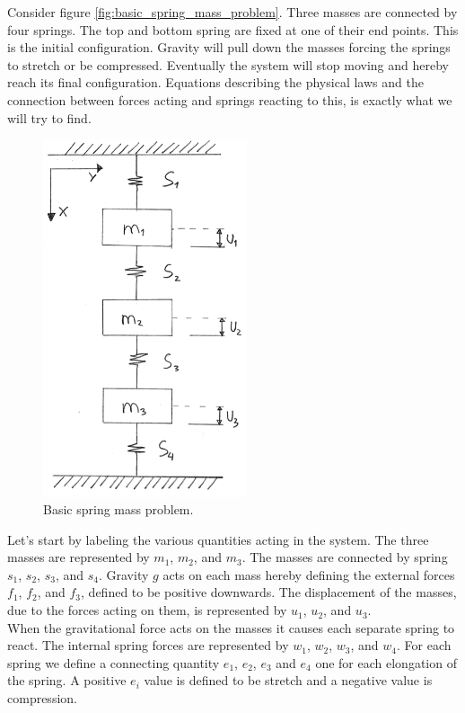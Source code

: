 Consider figure \vref{fig:basic_spring_mass_problem}.
Three masses are connected by four
springs. The top and bottom spring are fixed at one of their end
points. This is the
initial configuration. Gravity will pull down the masses forcing the
springs to stretch or be compressed. Eventually the system will stop
moving and hereby reach its final configuration. Equations
describing the physical laws and the connection between forces acting
and springs reacting to this, is exactly what we will try to find. \\

\layoutnewpage

\begin{figure}
  \centering
  \includegraphics[width=6cm]{./images/equilibrium_framework_basic_spring_mass_problem.png}
\caption{Basic spring mass problem.}
\label{fig:basic_spring_mass_problem}
\end{figure}

Let's start by labeling the various quantities acting in the
system. The three masses are represented by $m_1$, $m_2$, and $m_3$. 
The masses are connected by spring $s_1$, $s_2$, $s_3$, and $s_4$.
Gravity $g$ acts on each mass hereby defining the external
forces $f_1$, $f_2$, and $f_3$, defined to be positive downwards. 
The displacement of the masses, due to the forces acting on them, is represented
by $u_1$, $u_2$, and $u_3$. \\ 

When the gravitational force acts on the masses it causes each separate spring to
react. The internal spring forces are represented by $w_1$, $w_2$,
$w_3$, and $w_4$. For each spring we define a connecting quantity
$e_1$, $e_2$, $e_3$ and $e_4$ one for each elongation of the spring. A
positive $e_i$ value is defined to be stretch and a negative value is
compression. \\

